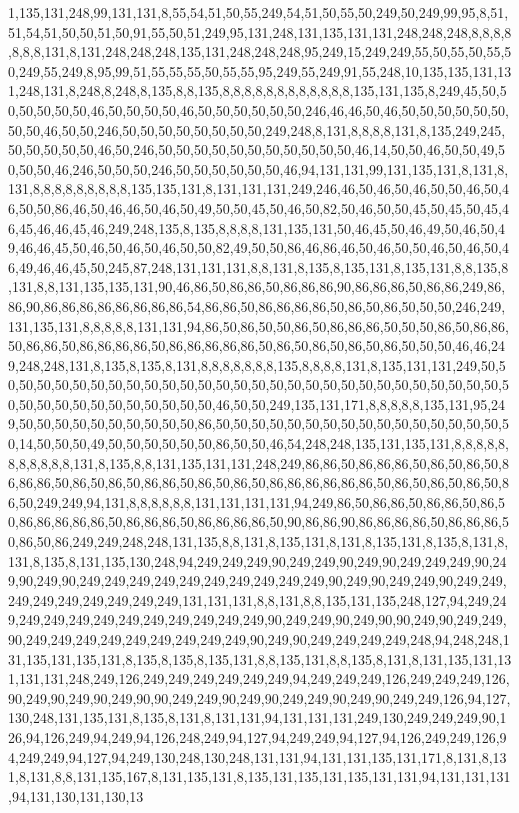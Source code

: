 1,135,131,248,99,131,131,8,55,54,51,50,55,249,54,51,50,55,50,249,50,249,99,95,8,51,51,54,51,50,50,51,50,91,55,50,51,249,95,131,248,131,135,131,131,248,248,248,8,8,8,8,8,8,8,131,8,131,248,248,248,135,131,248,248,248,95,249,15,249,249,55,50,55,50,55,50,249,55,249,8,95,99,51,55,55,55,50,55,55,95,249,55,249,91,55,248,10,135,135,131,131,248,131,8,248,8,248,8,135,8,8,135,8,8,8,8,8,8,8,8,8,8,8,8,135,131,135,8,249,45,50,50,50,50,50,50,46,50,50,50,50,46,50,50,50,50,50,50,246,46,46,50,46,50,50,50,50,50,50,50,50,46,50,50,246,50,50,50,50,50,50,50,50,249,248,8,131,8,8,8,8,131,8,135,249,245,50,50,50,50,50,46,50,246,50,50,50,50,50,50,50,50,50,50,50,46,14,50,50,46,50,50,49,50,50,50,46,246,50,50,50,246,50,50,50,50,50,50,46,94,131,131,99,131,135,131,8,131,8,131,8,8,8,8,8,8,8,8,8,135,135,131,8,131,131,131,249,246,46,50,46,50,46,50,50,46,50,46,50,50,86,46,50,46,46,50,46,50,49,50,50,45,50,46,50,82,50,46,50,50,45,50,45,50,45,46,45,46,46,45,46,249,248,135,8,135,8,8,8,8,131,135,131,50,46,45,50,46,49,50,46,50,49,46,46,45,50,46,50,46,50,46,50,50,82,49,50,50,86,46,86,46,50,46,50,50,46,50,46,50,46,49,46,46,45,50,245,87,248,131,131,131,8,8,131,8,135,8,135,131,8,135,131,8,8,135,8,131,8,8,131,135,135,131,90,46,86,50,86,86,50,86,86,86,90,86,86,86,50,86,86,249,86,86,90,86,86,86,86,86,86,86,86,54,86,86,50,86,86,86,86,50,86,50,86,50,50,50,246,249,131,135,131,8,8,8,8,8,131,131,94,86,50,86,50,50,86,50,86,86,86,50,50,50,86,50,86,86,50,86,86,50,86,86,86,86,50,86,86,86,86,86,50,86,50,86,50,86,50,86,50,50,50,46,46,249,248,248,131,8,135,8,135,8,131,8,8,8,8,8,8,8,135,8,8,8,8,131,8,135,131,131,249,50,50,50,50,50,50,50,50,50,50,50,50,50,50,50,50,50,50,50,50,50,50,50,50,50,50,50,50,50,50,50,50,50,50,50,50,50,50,50,50,50,46,50,50,249,135,131,171,8,8,8,8,8,135,131,95,249,50,50,50,50,50,50,50,50,50,50,86,50,50,50,50,50,50,50,50,50,50,50,50,50,50,50,50,50,14,50,50,50,49,50,50,50,50,50,50,86,50,50,46,54,248,248,135,131,135,131,8,8,8,8,8,8,8,8,8,8,8,131,8,135,8,8,131,135,131,131,248,249,86,86,50,86,86,86,50,86,50,86,50,86,86,86,50,86,50,86,50,86,86,50,86,50,86,50,86,86,86,86,86,86,50,86,50,86,50,86,50,86,50,249,249,94,131,8,8,8,8,8,8,131,131,131,131,94,249,86,50,86,86,50,86,86,50,86,50,86,86,86,86,86,50,86,86,86,50,86,86,86,86,50,90,86,86,90,86,86,86,86,50,86,86,86,50,86,50,86,249,249,248,248,131,135,8,8,131,8,135,131,8,131,8,135,131,8,135,8,131,8,131,8,135,8,131,135,130,248,94,249,249,249,90,249,249,90,249,90,249,249,249,90,249,90,249,90,249,249,249,249,249,249,249,249,249,249,90,249,90,249,249,90,249,249,249,249,249,249,249,249,249,131,131,131,8,8,131,8,8,135,131,135,248,127,94,249,249,249,249,249,249,249,249,249,249,249,249,90,249,249,90,249,90,90,249,90,249,249,90,249,249,249,249,249,249,249,249,249,90,249,90,249,249,249,249,248,94,248,248,131,135,131,135,131,8,135,8,135,8,135,131,8,8,135,131,8,8,135,8,131,8,131,135,131,131,131,131,248,249,126,249,249,249,249,249,249,94,249,249,249,126,249,249,249,126,90,249,90,249,90,249,90,90,249,249,90,249,90,249,249,90,249,90,249,249,126,94,127,130,248,131,135,131,8,135,8,131,8,131,131,94,131,131,131,249,130,249,249,249,90,126,94,126,249,94,249,94,126,248,249,94,127,94,249,249,94,127,94,126,249,249,126,94,249,249,94,127,94,249,130,248,130,248,131,131,94,131,131,135,131,171,8,131,8,131,8,131,8,8,131,135,167,8,131,135,131,8,135,131,135,131,135,131,131,94,131,131,131,94,131,130,131,130,13
